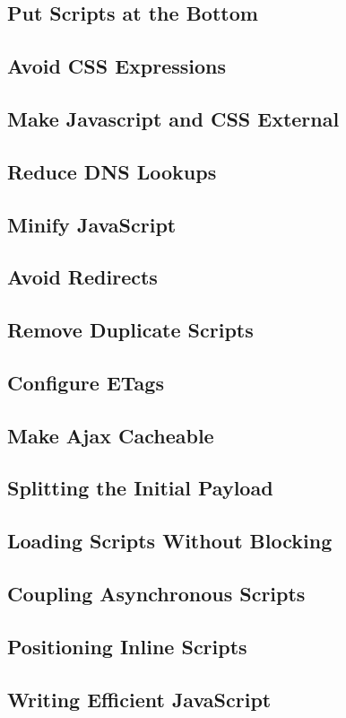 \subsection{Put Scripts at the Bottom}
\subsection{Avoid CSS Expressions}
\subsection{Make Javascript and CSS External}
\subsection{Reduce DNS Lookups}
\subsection{Minify JavaScript}
\subsection{Avoid Redirects}
\subsection{Remove Duplicate Scripts}
\subsection{Configure ETags}
\subsection{Make Ajax Cacheable}
\subsection{Splitting the Initial Payload}
\subsection{Loading Scripts Without Blocking}
\subsection{Coupling Asynchronous Scripts}
\subsection{Positioning Inline Scripts}
\subsection{Writing Efficient JavaScript}
